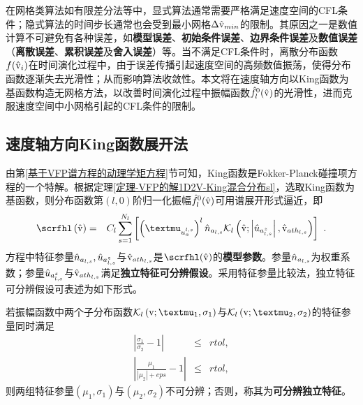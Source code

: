   在网格类算法如有限差分法等中，显式算法通常需要严格满足速度空间的CFL条件；隐式算法的时间步长通常也会受到最小网格$\Delta \hat{\mathrm{v}}_{min}$的限制。其原因之一是数值计算不可避免有各种误差，如\textbf{模型误差}、\textbf{初始条件误差}、\textbf{边界条件误差}及\textbf{数值误差}（\textbf{离散误差}、\textbf{累积误差}及\textbf{舍入误差}）等。当不满足CFL条件时，离散分布函数$f(\hat{\mathrm{v}}_i)$在时间演化过程中，由于误差传播引起速度空间的高频数值振荡，使得分布函数逐渐失去光滑性；从而影响算法收敛性。本文将在速度轴方向以King函数为基函数构造无网格方法，以改善时间演化过程中振幅函数$\hat{f}_l^0(\hat{\mathrm{v}})$的光滑性，进而克服速度空间中小网格引起的CFL条件的限制。

\subsection{速度轴方向King函数展开法}
\label{速度轴方向King函数展开法}

由第\ref{基于VFP谱方程的动理学矩方程}节可知，King函数是Fokker-Planck碰撞项方程的一个特解。根据定理\ref{定理-VFP的解1D2V-King混合分布sl}，选取King函数为基函数，则分布函数第$(l,0)$阶归一化振幅$\hat{f}_l^0(\hat{\mathrm{v}})$可用谱展开形式逼近，即
\begin{eqnarray}
    \scrfhl \left(\rmvh \right) &=& C_l \sum_{s=1}^{N_l} \left [ \left (\muuasl \right)^l \nhasl \Kl \left(\rmvh;\left |\uhazsl \right | , \vhathsl \right) \right ]  ~.  \label{scrfl0sl}
\end{eqnarray}
方程中特征参量$\hat{n}_{a_{l,s}},{\hat{u}}_{a_{l,s}^z}$与$\hat{\mathrm{v}}_{{ath}_{l,s}}$是$\scrfhl(\rmvh)$的\textbf{模型参数}。参量$\hat{n}_{a_{l,s}}$为权重系数；参量${\hat{u}}_{a_{l,s}^z}$与$\hat{\mathrm{v}}_{{ath}_{l,s}}$满足\textbf{独立特征可分辨假设}。采用特征参量比较法，独立特征可分辨假设可表述为如下形式。
\begin{theorem} \label{假设-独立特征可分辨假设}
    若振幅函数中两个子分布函数$\Kl \left(\rmv;\mu_1,\sigma_1 \right)$与$\Kl \left(\rmv;\mu_2,\sigma_2 \right)$的特征参量同时满足
    \begin{eqnarray}
      \left| \frac{\sigma_1}{\sigma_2} - 1 \right|  & \le & rtol , \label{Dvhths}
      \\
      \left| \frac{\mu_1}{\left| \mu_2 \right| + eps} - 1 \right|  & \le & rtol, \label{Duhs}
    \end{eqnarray}
    则两组特征参量$\left(\mu_1,\sigma_1 \right)$与$\left(\mu_2,\sigma_2 \right)$不可分辨；否则，称其为\textbf{可分辨独立特征}。
\end{theorem}

